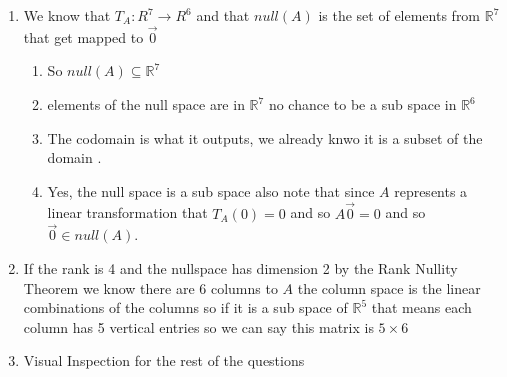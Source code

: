 \documentclass[11pt]{book}
\begin{document}
\begin{enumerate}
    \item We know that $T_{A}  : R^{7}  \to R^{6}  $ and that $\mathit{null} \left(A\right) $ is the set of elements from $\mathbb{R} ^{7} $ that get mapped to $\vec{0} $
        \begin{enumerate}
            \item So $\mathit{null} \left(A\right) \subseteq \mathbb{R} ^{7} $ 
            \item elements  of the null space are in $\mathbb{R} ^{7} $ no chance to be a sub space in $\mathbb{R} ^{6} $ 
            \item The codomain is what it outputs, we already knwo it is a subset of the domain .
        \item Yes, the null space is a sub space also note that since $A$ represents a linear transformation that $T_{A} \left(0\right) = 0$ and so $A\vec{0} = 0$ and so $\vec{0} \in \mathit{null} \left(A\right) $. 
        \end{enumerate}
    \item If the rank is 4 and the nullspace has dimension 2 by the Rank Nullity Theorem we know there are 6 columns to $A$ the column space is the linear combinations of the columns so if it is a sub space of $\mathbb{R} ^{5} $    that means each column has 5 vertical entries so we can say this matrix is $5 \times 6$ 
    \item Visual Inspection for the rest of the questions
\end{enumerate}


\end{document}
